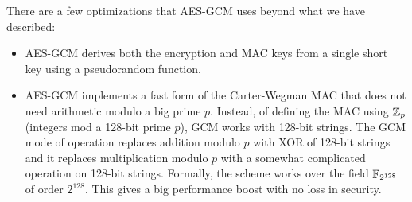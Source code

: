 There are a few optimizations that AES-GCM uses beyond what we have described:
\begin{itemize}
  \item AES-GCM derives both the encryption and MAC keys from a single short key
        using a pseudorandom function.
  \item AES-GCM implements a fast form of the Carter-Wegman MAC that does not 
        need arithmetic modulo a big prime $p$.
        Instead, of defining the MAC using $\mathbb{Z}_p$ (integers mod a 128-bit prime $p$),
        GCM works with 128-bit strings.
        The GCM mode of operation replaces addition modulo $p$ with XOR of 128-bit strings
        and it replaces multiplication modulo $p$ with a somewhat complicated operation
        on 128-bit strings. 
        Formally, the scheme works over the field $\mathbb{F}_{2^{128}}$ of order $2^{128}$.
        This gives a big performance boost with no loss in security.
\end{itemize}



